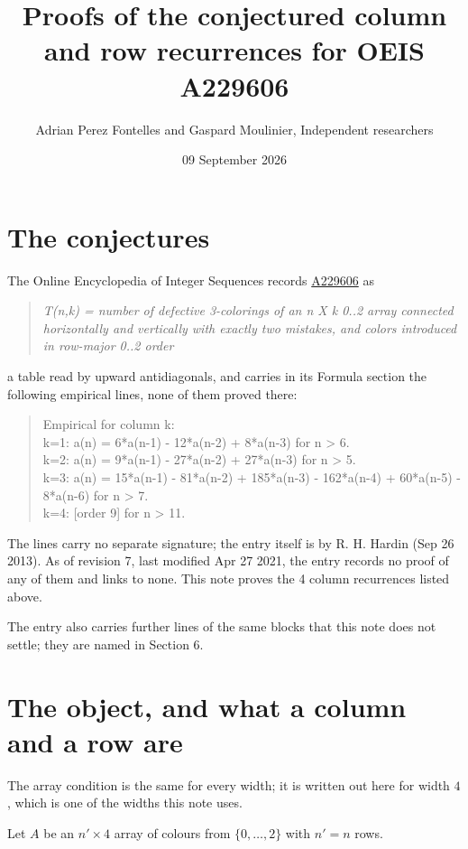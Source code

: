 \documentclass[11pt]{article}
\title{Proofs of the conjectured column and row recurrences for OEIS A229606}
\author{Adrian Perez Fontelles and Gaspard Moulinier, Independent researchers}
\date{09 September 2026}
\theoremstyle{definition}
\begin{document}
\maketitle
\section{The conjectures}

The Online Encyclopedia of Integer Sequences records \href{https://oeis.org/A229606}{A229606} as

\begin{quote}\itshape T(n,k) = number of defective 3-colorings of an n X k 0..2 array connected horizontally and vertically with exactly two mistakes, and colors introduced in row-major 0..2 order\end{quote}

a table read by upward antidiagonals, and carries in its Formula section the following empirical lines, none of them proved there:

\begin{quote}\ttfamily Empirical for column k:\\
k=1: a(n) = 6*a(n-1) - 12*a(n-2) + 8*a(n-3) for n > 6.\\k=2: a(n) = 9*a(n-1) - 27*a(n-2) + 27*a(n-3) for n > 5.\\k=3: a(n) = 15*a(n-1) - 81*a(n-2) + 185*a(n-3) - 162*a(n-4) + 60*a(n-5) - 8*a(n-6) for n > 7.\\k=4: [order 9] for n > 11.\end{quote}

The lines carry no separate signature; the entry itself is by R. H. Hardin (Sep 26 2013). As of revision 7, last modified Apr 27 2021, the entry records no proof of any of them and links to none. This note proves the 4 column recurrences listed above.

The entry also carries further lines of the same blocks that this note does not settle; they are named in Section 6.

\section{The object, and what a column and a row are}

The array condition is the same for every width; it is written out here for width $4$, which is one of the widths this note uses.

Let $A$ be an $n' \times 4$ array of colours from $\{0,\dots,2\}$ with $n' = n$ rows.
\end{document}
